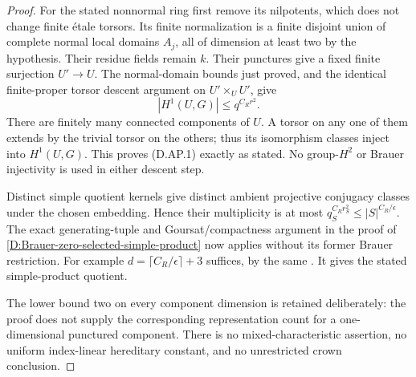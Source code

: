 \begin{proof}
For the stated nonnormal ring first remove its
nilpotents, which does not change finite étale
torsors. Its finite normalization is a finite
disjoint union of complete normal local domains
\(A_j\), all of dimension at least two by the
hypothesis. Their residue fields remain \(k\).
Their punctures give a fixed finite surjection
\(U'\to U\). The normal-domain bounds just proved,
and the identical finite-proper torsor descent
argument on \(U'\times_U U'\), give
\[
                     |H^1(U,G)|\leq q^{C_Rr^2}.
 \]
There are finitely many connected components of
\(U\). A torsor on any one of them extends by
the trivial torsor on the others; thus its
isomorphism classes inject into \(H^1(U,G)\).
This proves (D.AP.1) exactly as stated.
No group-\(H^2\) or Brauer injectivity is used
in either descent step.

Distinct simple quotient kernels give distinct
ambient projective conjugacy classes under the
chosen embedding. Hence their multiplicity is
at most \(q_S^{C_Rr_S^2}\leq |S|^{C_R/\epsilon}\).
The exact generating-tuple and Goursat/compactness
argument in the proof of
\ref{D:Brauer-zero-selected-simple-product}
now applies without its former Brauer restriction.
For example \(d=\lceil C_R/\epsilon\rceil+3\)
suffices, by the same
\citet[Proposition2.6(ii), equations(2.1)--(2.2),
pp12--13]{LucchiniMarionTracey2020D}.
It gives the stated simple-product quotient.

The lower bound two on every component dimension
is retained deliberately: the proof does not
supply the corresponding representation count
for a one-dimensional punctured component.
There is no mixed-characteristic assertion,
no uniform index-linear hereditary constant,
and no unrestricted crown conclusion.
\end{proof}
